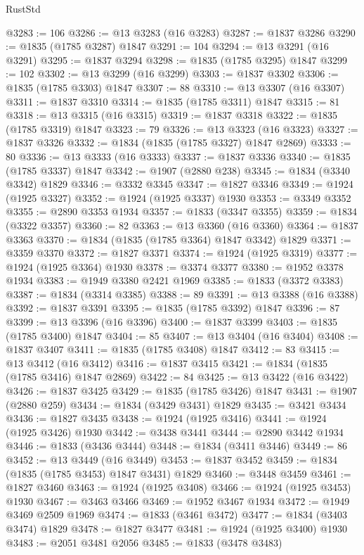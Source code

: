 \begin{lexlean}{RustStd}
\begin{coremodule}
@3283 := 106
@3286 := @13 @3283 (@16 @3283)
@3287 := @1837 @3286
@3290 := @1835 (@1785 @3287) @1847
@3291 := 104
@3294 := @13 @3291 (@16 @3291)
@3295 := @1837 @3294
@3298 := @1835 (@1785 @3295) @1847
@3299 := 102
@3302 := @13 @3299 (@16 @3299)
@3303 := @1837 @3302
@3306 := @1835 (@1785 @3303) @1847
@3307 := 88
@3310 := @13 @3307 (@16 @3307)
@3311 := @1837 @3310
@3314 := @1835 (@1785 @3311) @1847
@3315 := 81
@3318 := @13 @3315 (@16 @3315)
@3319 := @1837 @3318
@3322 := @1835 (@1785 @3319) @1847
@3323 := 79
@3326 := @13 @3323 (@16 @3323)
@3327 := @1837 @3326
@3332 := @1834 (@1835 (@1785 @3327) @1847 @2869)
@3333 := 80
@3336 := @13 @3333 (@16 @3333)
@3337 := @1837 @3336
@3340 := @1835 (@1785 @3337) @1847
@3342 := @1907 (@2880 @238)
@3345 := @1834 (@3340 @3342) @1829
@3346 := @3332 @3345
@3347 := @1827 @3346
@3349 := @1924 (@1925 @3327)
@3352 := @1924 (@1925 @3337) @1930
@3353 := @3349 @3352
@3355 := @2890 @3353 @1934
@3357 := @1833 (@3347 @3355)
@3359 := @1834 (@3322 @3357)
@3360 := 82
@3363 := @13 @3360 (@16 @3360)
@3364 := @1837 @3363
@3370 := @1834 (@1835 (@1785 @3364) @1847 @3342) @1829
@3371 := @3359 @3370
@3372 := @1827 @3371
@3374 := @1924 (@1925 @3319)
@3377 := @1924 (@1925 @3364) @1930
@3378 := @3374 @3377
@3380 := @1952 @3378 @1934
@3383 := @1949 @3380 @2421 @1969
@3385 := @1833 (@3372 @3383)
@3387 := @1834 (@3314 @3385)
@3388 := 89
@3391 := @13 @3388 (@16 @3388)
@3392 := @1837 @3391
@3395 := @1835 (@1785 @3392) @1847
@3396 := 87
@3399 := @13 @3396 (@16 @3396)
@3400 := @1837 @3399
@3403 := @1835 (@1785 @3400) @1847
@3404 := 85
@3407 := @13 @3404 (@16 @3404)
@3408 := @1837 @3407
@3411 := @1835 (@1785 @3408) @1847
@3412 := 83
@3415 := @13 @3412 (@16 @3412)
@3416 := @1837 @3415
@3421 := @1834 (@1835 (@1785 @3416) @1847 @2869)
@3422 := 84
@3425 := @13 @3422 (@16 @3422)
@3426 := @1837 @3425
@3429 := @1835 (@1785 @3426) @1847
@3431 := @1907 (@2880 @259)
@3434 := @1834 (@3429 @3431) @1829
@3435 := @3421 @3434
@3436 := @1827 @3435
@3438 := @1924 (@1925 @3416)
@3441 := @1924 (@1925 @3426) @1930
@3442 := @3438 @3441
@3444 := @2890 @3442 @1934
@3446 := @1833 (@3436 @3444)
@3448 := @1834 (@3411 @3446)
@3449 := 86
@3452 := @13 @3449 (@16 @3449)
@3453 := @1837 @3452
@3459 := @1834 (@1835 (@1785 @3453) @1847 @3431) @1829
@3460 := @3448 @3459
@3461 := @1827 @3460
@3463 := @1924 (@1925 @3408)
@3466 := @1924 (@1925 @3453) @1930
@3467 := @3463 @3466
@3469 := @1952 @3467 @1934
@3472 := @1949 @3469 @2509 @1969
@3474 := @1833 (@3461 @3472)
@3477 := @1834 (@3403 @3474) @1829
@3478 := @1827 @3477
@3481 := @1924 (@1925 @3400) @1930
@3483 := @2051 @3481 @2056
@3485 := @1833 (@3478 @3483)

\end{coremodule}
\end{lexlean}
